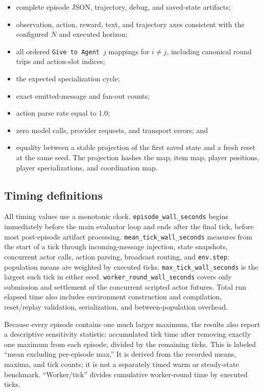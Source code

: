 \documentclass[11pt]{article}
\newcommand{\code}[1]{\texttt{#1}}
\begin{document}
\begin{itemize}
  \item complete episode JSON, trajectory, debug, and saved-state artifacts;
  \item observation, action, reward, text, and trajectory axes consistent with
        the configured $N$ and executed horizon;
  \item all ordered \code{Give to Agent $j$} mappings for $i\ne j$, including
        canonical round trips and action-slot indices;
  \item the expected specialization cycle;
  \item exact emitted-message and fan-out counts;
  \item action parse rate equal to 1.0;
  \item zero model calls, provider requests, and transport errors; and
  \item equality between a stable projection of the first saved state and a
        fresh reset at the same seed.  The projection hashes the map, item map,
        player positions, player specializations, and coordination map.
\end{itemize}

\subsection{Timing definitions}

All timing values use a monotonic clock.
\code{episode\_wall\_seconds} begins immediately before the main evaluator loop
and ends after the final tick, before most post-episode artifact processing.
\code{mean\_tick\_wall\_seconds} measures from the start of a tick through
incoming-message injection, state snapshots, concurrent actor calls, action
parsing, broadcast routing, and \code{env.step}; population means are weighted
by executed ticks.  \code{max\_tick\_wall\_seconds} is the largest such tick in
either seed.  \code{worker\_round\_wall\_seconds} covers only submission and
settlement of the concurrent scripted actor futures.  Total run elapsed time
also includes environment construction and compilation, reset/replay
validation, serialization, and between-population overhead.

Because every episode contains one much larger maximum, the results also report
a descriptive sensitivity statistic: accumulated tick time after removing
exactly one maximum from each episode, divided by the remaining ticks.  This is
labeled ``mean excluding per-episode max.''  It is derived from the recorded
means, maxima, and tick counts; it is not a separately timed warm or
steady-state benchmark.  ``Worker/tick'' divides cumulative worker-round time by
executed ticks.
\end{document}
